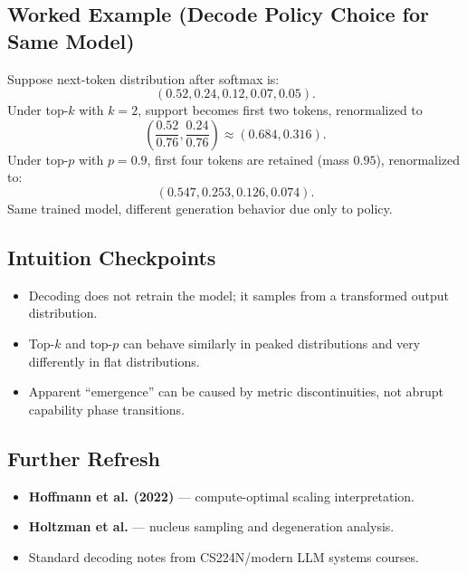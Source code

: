 \subsection*{Worked Example (Decode Policy Choice for Same Model)}
Suppose next-token distribution after softmax is:
\[
(0.52,0.24,0.12,0.07,0.05).
\]
Under top-$k$ with $k=2$, support becomes first two tokens, renormalized to
\[
\left(\frac{0.52}{0.76},\frac{0.24}{0.76}\right)\approx(0.684,0.316).
\]
Under top-$p$ with $p=0.9$, first four tokens are retained (mass $0.95$), renormalized to:
\[
(0.547,0.253,0.126,0.074).
\]
Same trained model, different generation behavior due only to policy.

\subsection*{Intuition Checkpoints}
\begin{itemize}[leftmargin=1.5em]
  \item Decoding does not retrain the model; it samples from a transformed output distribution.
  \item Top-$k$ and top-$p$ can behave similarly in peaked distributions and very differently in flat distributions.
  \item Apparent ``emergence'' can be caused by metric discontinuities, not abrupt capability phase transitions.
\end{itemize}

\subsection*{Further Refresh}
\begin{itemize}[leftmargin=1.5em]
  \item \textbf{Hoffmann et al. (2022)} --- compute-optimal scaling interpretation.
  \item \textbf{Holtzman et al.} --- nucleus sampling and degeneration analysis.
  \item Standard decoding notes from CS224N/modern LLM systems courses.
\end{itemize}

